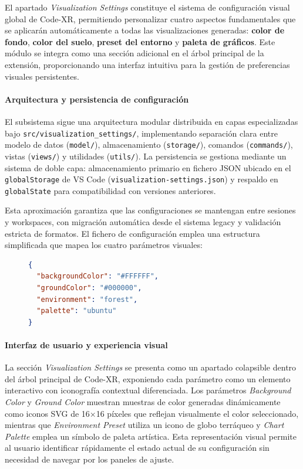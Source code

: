 \documentclass[a4paper, 12pt]{book}
\begin{document}
El apartado \emph{Visualization Settings} constituye el sistema de configuración visual global de Code-XR, permitiendo personalizar cuatro aspectos fundamentales que se aplicarán automáticamente a todas las visualizaciones generadas: \textbf{color de fondo}, \textbf{color del suelo}, \textbf{preset del entorno} y \textbf{paleta de gráficos}. Este módulo se integra como una sección adicional en el árbol principal de la extensión, proporcionando una interfaz intuitiva para la gestión de preferencias visuales persistentes.

\paragraph{Arquitectura y persistencia de configuración}
El subsistema sigue una arquitectura modular distribuida en capas especializadas bajo \texttt{src/visualization\_settings/}, implementando separación clara entre modelo de datos (\texttt{model/}), almacenamiento (\texttt{storage/}), comandos (\texttt{commands/}), vistas (\texttt{views/}) y utilidades (\texttt{utils/}). La persistencia se gestiona mediante un sistema de doble capa: almacenamiento primario en fichero JSON ubicado en el \texttt{globalStorage} de VS Code (\texttt{visualization-settings.json}) y respaldo en \texttt{globalState} para compatibilidad con versiones anteriores.

Esta aproximación garantiza que las configuraciones se mantengan entre sesiones y workspaces, con migración automática desde el sistema legacy y validación estricta de formatos. El fichero de configuración emplea una estructura simplificada que mapea los cuatro parámetros visuales:

\begin{figure}[H]
\centering
\begin{minipage}{0.9\linewidth}
\begin{lstlisting}[language=json,
caption={Estructura del archivo \texttt{visualization-settings.json} que persiste las preferencias visuales globales.},
label={fig:visualization-settings-json}]
{
  "backgroundColor": "#FFFFFF",
  "groundColor": "#000000",
  "environment": "forest", 
  "palette": "ubuntu"
}
\end{lstlisting}
\end{minipage}
\end{figure}

\paragraph{Interfaz de usuario y experiencia visual}
La sección \emph{Visualization Settings} se presenta como un apartado colapsible dentro del árbol principal de Code-XR, exponiendo cada parámetro como un elemento interactivo con iconografía contextual diferenciada. Los parámetros \emph{Background Color} y \emph{Ground Color} muestran muestras de color generadas dinámicamente como iconos SVG de 16×16 píxeles que reflejan visualmente el color seleccionado, mientras que \emph{Environment Preset} utiliza un icono de globo terráqueo y \emph{Chart Palette} emplea un símbolo de paleta artística. Esta representación visual permite al usuario identificar rápidamente el estado actual de su configuración sin necesidad de navegar por los paneles de ajuste.
\end{document}

